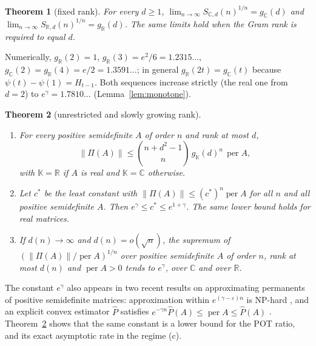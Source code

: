\documentclass[11pt,a4paper]{article}
\newtheorem{theorem}{Theorem}[section]
\theoremstyle{remark}
\newcommand{\per}{\operatorname{per}}
\newcommand{\norm}[1]{\left\lVert#1\right\rVert}
\newcommand{\C}{\mathbb C}
\newcommand{\R}{\mathbb R}
\newcommand{\K}{\mathbb K}
\begin{document}
\begin{theorem}[fixed rank]\label{thm:full}
For every $d\ge1$, $\lim_{n\to\infty}S_{\C,d}(n)^{1/n}=g_\C(d)$ and $\lim_{n\to\infty}S_{\R,d}(n)^{1/n}=g_\R(d)$. The same limits hold when the Gram rank is required to equal $d$.
\end{theorem}

Numerically, $g_\R(2)=1$, $g_\R(3)=e^2/6=1.2315\ldots$, $g_\C(2)=g_\R(4)=e/2=1.3591\ldots$; in general $g_\R(2t)=g_\C(t)$ because $\psi(t)-\psi(1)=H_{t-1}$. Both sequences increase strictly (the real one from $d=2$) to $e^\gamma=1.7810\ldots$ (Lemma~\ref{lem:monotone}).

\begin{theorem}[unrestricted and slowly growing rank]\label{thm:unrestricted}
\begin{enumerate}
\item[(a)] For every positive semidefinite $A$ of order $n$ and rank at most $d$,
\[
\norm{\Pi(A)}\le\binom{n+d^2-1}{n}\,g_\K(d)^n\,\per A ,
\]
with $\K=\R$ if $A$ is real and $\K=\C$ otherwise.
\item[(b)] Let $c^*$ be the least constant with $\norm{\Pi(A)}\le(c^*)^n\per A$ for all $n$ and all positive semidefinite $A$. Then $e^\gamma\le c^*\le e^{1+\gamma}$. The same lower bound holds for real matrices.
\item[(c)] If $d(n)\to\infty$ and $d(n)=o(\sqrt n)$, the supremum of $(\norm{\Pi(A)}/\per A)^{1/n}$ over positive semidefinite $A$ of order $n$, rank at most $d(n)$ and $\per A>0$ tends to $e^\gamma$, over $\C$ and over $\R$.
\end{enumerate}
\end{theorem}

The constant $e^\gamma$ also appears in two recent results on approximating permanents of positive semidefinite matrices: approximation within $e^{(\gamma-\varepsilon)n}$ is NP-hard \cite{ENO}, and an explicit convex estimator $\widehat P$ satisfies $e^{-\gamma n}\widehat P(A)\le\per A\le\widehat P(A)$ \cite{AE26}. Theorem~\ref{thm:unrestricted} shows that the same constant is a lower bound for the POT ratio, and its exact asymptotic rate in the regime (c).
\end{document}

